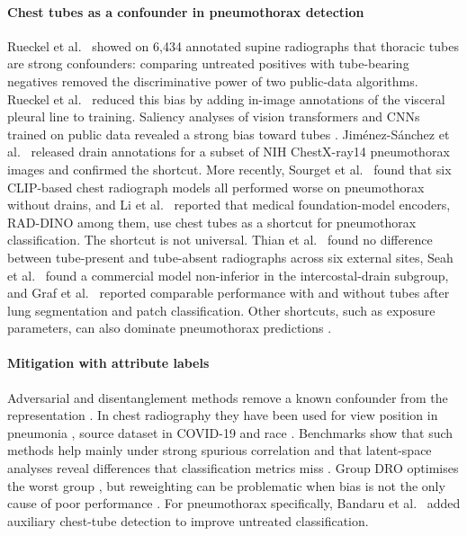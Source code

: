 \documentclass{ieeeaccess}
\begin{document}
\paragraph{Chest tubes as a confounder in pneumothorax detection}
Rueckel et al.~\cite{rueckel2020tubes} showed on 6{,}434 annotated supine radiographs that thoracic tubes are strong confounders: comparing untreated positives with tube-bearing negatives removed the discriminative power of two public-data algorithms. Rueckel et al.~\cite{rueckel2021annotations} reduced this bias by adding in-image annotations of the visceral pleural line to training. Saliency analyses of vision transformers and CNNs trained on public data revealed a strong bias toward tubes \cite{wollek2023attention}. Jim\'enez-S\'anchez et al.~\cite{jimenez2023shortcuts} released drain annotations for a subset of NIH ChestX-ray14 pneumothorax images and confirmed the shortcut. More recently, Sourget et al.~\cite{sourget2025clip} found that six CLIP-based chest radiograph models all performed worse on pneumothorax without drains, and Li et al.~\cite{li2025featurequality} reported that medical foundation-model encoders, RAD-DINO among them, use chest tubes as a shortcut for pneumothorax classification. The shortcut is not universal. Thian et al.~\cite{thian2021external} found no difference between tube-present and tube-absent radiographs across six external sites, Seah et al.~\cite{seah2021hidden} found a commercial model non-inferior in the intercostal-drain subgroup, and Graf et al.~\cite{graf2020tube} reported comparable performance with and without tubes after lung segmentation and patch classification. Other shortcuts, such as exposure parameters, can also dominate pneumothorax predictions \cite{shu2026exposure}.

\paragraph{Mitigation with attribute labels}
Adversarial and disentanglement methods remove a known confounder from the representation \cite{ganin2015dann,kim2019learning,zhao2020confounder}. In chest radiography they have been used for view position in pneumonia \cite{janizek2020adversarial}, source dataset in COVID-19 \cite{robinson2022disentangle} and race \cite{correa2023cav}. Benchmarks show that such methods help mainly under strong spurious correlation and that latent-space analyses reveal differences that classification metrics miss \cite{muller2026disentangle}. Group DRO optimises the worst group \cite{sagawa2020groupdro}, but reweighting can be problematic when bias is not the only cause of poor performance \cite{kumar2023droinvariant}. For pneumothorax specifically, Bandaru et al.~\cite{bandaru2026untreated} added auxiliary chest-tube detection to improve untreated classification.
\end{document}
